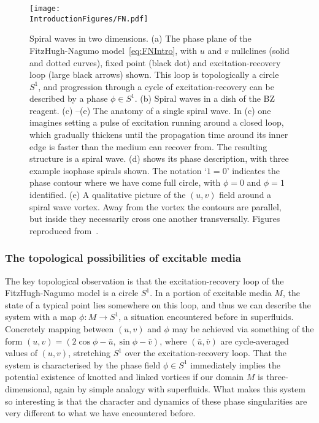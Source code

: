 \begin{figure}[htbp]
\centering
\texttt{[image: \\IntroductionFigures/FN.pdf]}
\caption[Spiral waves in two dimensions.]{Spiral waves in two dimensions. (a) The phase plane of the FitzHugh-Nagumo model~\eqref{eq:FNIntro}, with $u$ and $v$ nullclines (solid and dotted curves), fixed point (black dot) and excitation-recovery loop (large black arrows) shown. This loop is topologically a circle $S^1$, and progression through a cycle of excitation-recovery can be described by a phase $\phi \in S^1$. (b) Spiral waves in a dish of the BZ reagent. (c) --(e) The anatomy of a single spiral wave. In (c) one imagines setting a pulse of excitation running around a closed loop, which gradually thickens until the propagation time around its inner edge is faster than the medium can recover from. The resulting structure is a spiral wave. (d) shows its phase description, with three example isophase spirals shown. The notation `$1=0$' indicates the phase contour where we have come full circle, with $\phi = 0$ and $\phi =1$ identified.  (e) A qualitative picture of the $(u,v)$ field around a spiral wave vortex. Away from the vortex the contours are parallel, but inside they necessarily cross one another transversally. Figures reproduced from~\citep{Winfree1983}. }
\label{fig:FN}
\end{figure}

\subsubsection{The topological possibilities of excitable media}

The key topological observation is that the excitation-recovery loop of the FitzHugh-Nagumo model is a circle $S^1$. In a portion of excitable media $M$, the state of a typical point lies somewhere on this loop, and thus we can describe the system with a map $\phi : M \rightarrow S^1$, a situation encountered before in superfluids. Concretely mapping between $(u,v)$ and $\phi$ may be achieved via something of the form $(u,v) = (2 \cos \phi -\bar{u}, \sin \phi - \bar{v})$, where $(\bar{u},\bar{v})$ are cycle-averaged values of $(u,v)$, stretching $S^1$ over the excitation-recovery loop. That the system is characterised by the phase field $\phi \in S^1$ immediately implies the potential existence of knotted and linked vortices if our domain $M$ is three-dimensional, again by simple analogy with superfluids. What makes this system so interesting is that the character and dynamics of these phase singularities are very different to what we have encountered before. 

